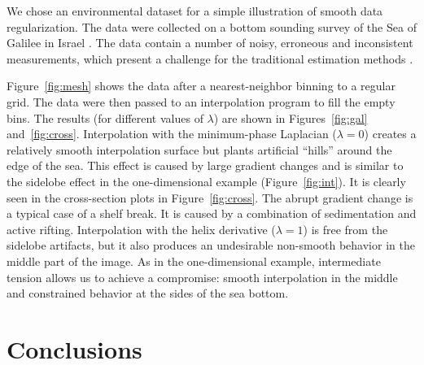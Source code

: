 We chose an environmental dataset \cite[]{iee} for a simple illustration
of smooth data regularization. The data were collected on a bottom
sounding survey of the Sea of Galilee in Israel \cite[]{zvi}.  The data
contain a number of noisy, erroneous and inconsistent measurements,
which present a challenge for the traditional estimation methods
\cite[]{galilee}.
\par
Figure~\ref{fig:mesh} shows the data after a nearest-neighbor binning
to a regular grid. The data were then passed to an interpolation
program to fill the empty bins. The results (for different values of
$\lambda$) are shown in Figures~\ref{fig:gal} and~\ref{fig:cross}.
Interpolation with the minimum-phase Laplacian ($\lambda=0$) creates a
relatively smooth interpolation surface but plants artificial
``hills'' around the edge of the sea. This effect is caused by large
gradient changes and is similar to the sidelobe effect in the
one-dimensional example (Figure~\ref{fig:int}).  It is clearly seen in
the cross-section plots in Figure~\ref{fig:cross}.  The abrupt
gradient change is a typical case of a shelf break. It is caused by a
combination of sedimentation and active rifting. Interpolation with
the helix derivative ($\lambda=1$) is free from the sidelobe
artifacts, but it also produces an undesirable non-smooth behavior in
the middle part of the image. As in the one-dimensional example,
intermediate tension allows us to achieve a compromise: smooth
interpolation in the middle and constrained behavior at the sides of
the sea bottom.





\section{Conclusions}

